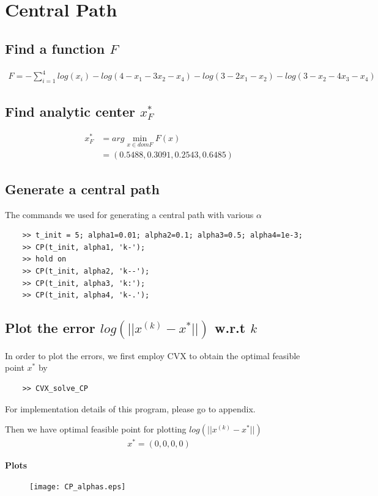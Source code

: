 \documentclass[11pt,a4paper]{article}
\begin{document}
\newpage
\section{Central Path}
\subsection{Find a function $F$}
\begin{align}
    F = -\sum_{i=1}^4 log(x_i) 
    - log (4 - x_1 - 3x_2 - x_4)
    - log (3 - 2x_1 - x_2)
    - log (3 - x_2 - 4x_3 - x_4)
\end{align}

\subsection{Find analytic center $x_F^*$}
\begin{align}
    x_F^* &= arg \min_{x\in dom F} F(x) \\
        &= (0.5488, 0.3091, 0.2543, 0.6485)
\end{align}

\subsection{Generate a central path}
The commands we used for generating a central path with various $\alpha$ 
\begin{verbatim}
    >> t_init = 5; alpha1=0.01; alpha2=0.1; alpha3=0.5; alpha4=1e-3;
    >> CP(t_init, alpha1, 'k-');
    >> hold on
    >> CP(t_init, alpha2, 'k--');
    >> CP(t_init, alpha3, 'k:');
    >> CP(t_init, alpha4, 'k-.');
\end{verbatim}

\subsection{Plot the error $log(|| x^{(k)} - x^*|| )$ w.r.t $k$}
In order to plot the errors, we first employ CVX to obtain the optimal feasible point $x^*$ by
\begin{verbatim}
    >> CVX_solve_CP
\end{verbatim}
For implementation details of this program, please go to appendix.

\noindent 
Then we have optimal feasible point for plotting $log(|| x^{(k)} - x^*|| )$
\begin{align}
    x^* = (0, 0, 0, 0)    
\end{align}

\noindent 
{\bf Plots}
\begin{figure}[h]
    \centering
    \texttt{[image: CP\_alphas.eps]}
\end{figure}
\end{document}
